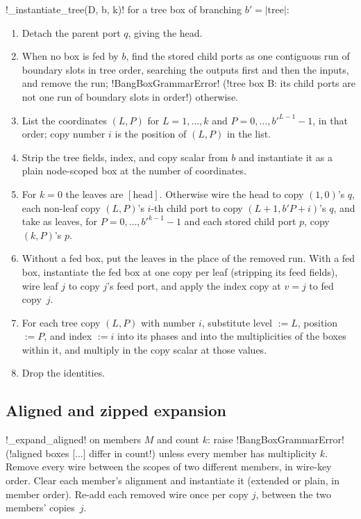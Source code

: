 \begin{algorithm}\label{alg:diagrams-tree}
\py!_instantiate_tree(D, b, k)! for a tree box of branching $b'=|\text{tree}|$:
\begin{enumerate}
\item Detach the parent port $q$, giving the head.
\item When no box is fed by $b$, find the stored child ports as one contiguous run of boundary slots in tree order, searching the outputs first and then the inputs, and remove the run; \py!BangBoxGrammarError! (\code!tree box B: its child ports are not one run of boundary slots in order!) otherwise.
\item List the coordinates $(L,P)$ for $L=1,\dots,k$ and $P=0,\dots,b'^{L-1}-1$, in that order; copy number $i$ is the position of $(L,P)$ in the list.
\item Strip the tree fields, index, and copy scalar from $b$ and instantiate it as a plain node-scoped box at the number of coordinates.
\item For $k=0$ the leaves are $[\text{head}]$. Otherwise wire the head to copy $(1,0)$'s $q$, each non-leaf copy $(L,P)$'s $i$-th child port to copy $(L+1,b'P+i)$'s $q$, and take as leaves, for $P=0,\dots,b'^{k-1}-1$ and each stored child port $p$, copy $(k,P)$'s $p$.
\item Without a fed box, put the leaves in the place of the removed run. With a fed box, instantiate the fed box at one copy per leaf (stripping its feed fields), wire leaf $j$ to copy $j$'s feed port, and apply the index copy at $v=j$ to fed copy~$j$.
\item For each tree copy $(L,P)$ with number $i$, substitute level $:=L$, position $:=P$, and index $:=i$ into its phases and into the multiplicities of the boxes within it, and multiply in the copy scalar at those values.
\item Drop the identities.
\end{enumerate}
\end{algorithm}

\subsection{Aligned and zipped expansion}\label{sec:diagrams-zip}

\begin{algorithm}\label{alg:diagrams-aligned}
\py!_expand_aligned! on members $M$ and count $k$: raise \py!BangBoxGrammarError! (\code!aligned boxes [...] differ in count!) unless every member has multiplicity $k$. Remove every wire between the scopes of two different members, in wire-key order. Clear each member's alignment and instantiate it (extended or plain, in member order). Re-add each removed wire once per copy $j$, between the two members' copies~$j$.
\end{algorithm}

